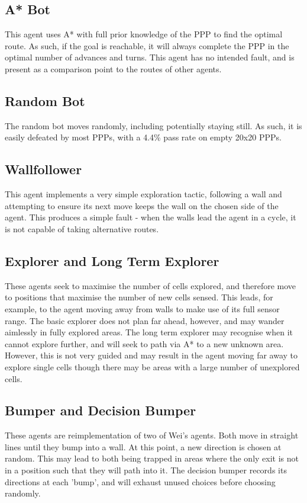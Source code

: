 \documentclass[authoryearcitations]{UoYCSproject}
\begin{document}
\subsection{A* Bot}
\label{sec:da_5_1}
This agent uses A* with full prior knowledge of the PPP to find the optimal route. As such, if the goal is reachable, it will always complete the PPP in the optimal number of advances and turns. This agent has no intended fault, and is present as a comparison point to the routes of other agents.

\subsection{Random Bot}
\label{sec:da_5_2}
The random bot moves randomly, including potentially staying still. As such, it is easily defeated by most PPPs, with a 4.4\% pass rate on empty 20x20 PPPs.

\subsection{Wallfollower}
\label{sec:da_5_3}
This agent implements a very simple exploration tactic, following a wall and attempting to ensure its next move keeps the wall on the chosen side of the agent. This produces a simple fault - when the walls lead the agent in a cycle, it is not capable of taking alternative routes.

\subsection{Explorer and Long Term Explorer}
\label{sec:da_5_4}
These agents seek to maximise the number of cells explored, and therefore move to positions that maximise the number of new cells sensed. This leads, for example, to the agent moving away from walls to make use of its full sensor range. The basic explorer does not plan far ahead, however, and may wander aimlessly in fully explored areas. The long term explorer may recognise when it cannot explore further, and will seek to path via A* to a new unknown area. However, this is not very guided and may result in the agent moving far away to explore single cells though there may be areas with a large number of unexplored cells.

\subsection{Bumper and Decision Bumper}
\label{sec:da_5_5}
These agents are reimplementation of two of Wei's agents. Both move in straight lines until they bump into a wall. At this point, a new direction is chosen at random. This may lead to both being trapped in areas where the only exit is not in a position such that they will path into it. The decision bumper records its directions at each 'bump', and will exhaust unused choices before choosing randomly.
\end{document}
